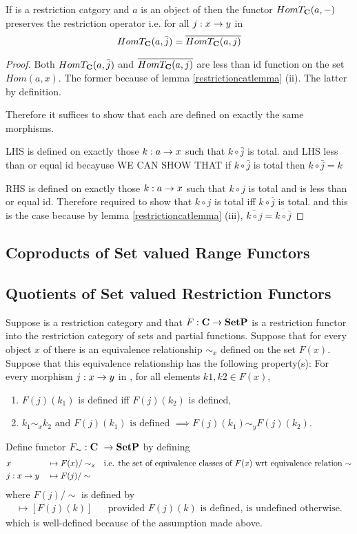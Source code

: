 \documentclass[10pt,a4paper]{article}
\theoremstyle{remark}
\begin{document}
\begin{lemma}
If \catcw is a restriction catgory and $a$ is an object of \catcw 
then the functor $HomT_{\textbf{C}}(a,-)$ preserves the restriction operator i.e.
for all $j:x \rightarrow y$ in \catc
$$HomT_{\textbf{C}}(a,\bar{j})=\overline{HomT_{\textbf{C}}(a,j)}$$
\end{lemma}
\begin{proof}
Both $HomT_{\textbf{C}}(a,\bar{j})$ and $\overline{HomT_{\textbf{C}}(a,j)}$ are less than id function on the set $Hom(a,x)$. 
The former because of lemma \ref{restrictioncatlemma} (ii).
The latter by definition.

Therefore it suffices to show that each are defined on exactly the same morphisms.

LHS is defined on exactly those $k:a \rightarrow x$ such that $k \circ \bar{j}$ is total.
and LHS less than or equal id becayuse
WE CAN SHOW THAT if $k \circ \bar{j}$ is total then $k \circ \bar{j}=k$

RHS is defined on exactly those $k:a \rightarrow x$ such that $k \circ j$ is total
and is less than or equal id. Therefore required to show that
$k \circ j$ is total iff $k \circ \bar{j}$ is total. and this is the case 
because by 
lemma \ref{restrictioncatlemma} (iii), $\overline{k \circ j}=\overline{k \circ \bar{j}}$ 
\end{proof}
\subsection{Coproducts of Set valued Range Functors}
\subsection{Quotients of Set valued Restriction Functors}
Suppose \catcw is a restriction category and that $F: \textbf{C} \rightarrow \textbf{SetP}$ is a restriction functor into the restriction category of sets and partial functions. Suppose that for every object $x$ of \catcw there is an equivalence relationship $\sim_x$ defined on the set $F(x)$. Suppose that this equivalence relationship has the following property(s):
For every morphism $j:x \rightarrow y$ in \catcw, for all elements $k1,k2 \in F(x)$,
\begin{enumerate}
\item $F(j)(k_1)$ is defined iff $F(j)(k_2)$ is defined, 
\item $k_1 \sim_x k_2 \mbox{ and } F(j)(k_1) \mbox{ is defined } \implies F(j)(k_1) \sim_y F(j)(k_2).$
\end{enumerate}
Define functor $F_\sim: \textbf{C}\  \rightarrow \textbf{SetP}$ by defining
\begin{align*}
&x             &&\mapsto F(x)/\sim_x 
                & \mbox{i.e. the set of equivalence classes of $F(x)$ wrt equivalence relation $\sim$}\\
&j: x \rightarrow y &&\mapsto F(j)/\sim
\end{align*} 
where $F(j)/\sim$ is defined by
\begin{align*}
[k] \mapsto [F(j)(k)] && \mbox{provided $F(j)(k)$ is defined, is undefined otherwise.}
\end{align*}
which is well-defined because of the assumption made above.
\end{document}
